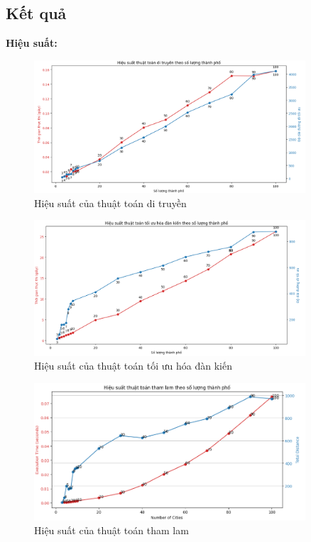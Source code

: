 \documentclass[14pt]{article}
\begin{document}
	\subsection{Kết quả}
	\textbf{Hiệu suất:}
	\begin{center}
		\begin{figure}[htbp]
			\centering
			\includegraphics[width=0.9\textwidth]{./Image/Hiệu suất GA.png}
			\caption{Hiệu suất của thuật toán di truyền}
			\label{fig:mylabel}
		\end{figure}
		\begin{figure}[htbp]
			\centering
			\includegraphics[width=0.9\textwidth]{./Image/Hiệu suất ACO.png}
			\caption{Hiệu suất của thuật toán tối ưu hóa đàn kiến}
			\label{fig:mylabel}
		\end{figure}
		\begin{figure}[htbp]
			\centering
			\includegraphics[width=0.9\textwidth]{./Image/Hiệu suất Greendy.png}
			\caption{Hiệu suất của thuật toán tham lam}
			\label{fig:mylabel}
		\end{figure}
	\end{center}
\end{document}
